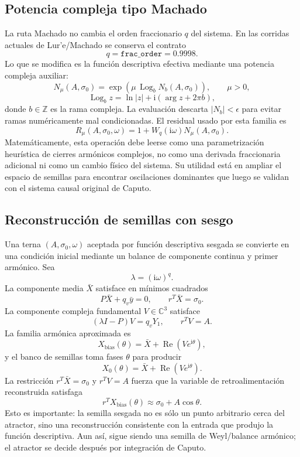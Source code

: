 \documentclass[11pt]{article}
\newcommand{\ii}{\mathrm{i}}
\newcommand{\Log}{\operatorname{Log}}
\begin{document}
\subsection{Potencia compleja tipo Machado}

La ruta Machado no cambia el orden fraccionario \(q\) del sistema. En las
corridas actuales de Lur'e/Machado se conserva el contrato
\[
q=\texttt{frac\_order}=0.9998.
\]
Lo que se modifica es la función descriptiva efectiva mediante una potencia
compleja auxiliar:
\[
N_\mu(A,\sigma_0)
=\exp\left(\mu\,\Log_b N_b(A,\sigma_0)\right),
\qquad \mu>0,
\]
\[
\Log_b z = \ln|z|+\ii\left(\arg z+2\pi b\right),
\]
donde \(b\in\mathbb{Z}\) es la rama compleja. La evaluación descarta
\(|N_b|<\epsilon\) para evitar ramas numéricamente mal condicionadas. El
residual usado por esta familia es
\[
R_\mu(A,\sigma_0,\omega)
=1+W_q(\ii\omega)N_\mu(A,\sigma_0).
\]
Matemáticamente, esta operación debe leerse como una parametrización
heurística de cierres armónicos complejos, no como una derivada fraccionaria
adicional ni como un cambio físico del sistema. Su utilidad está en ampliar el
espacio de semillas para encontrar oscilaciones dominantes que luego se
validan con el sistema causal original de Caputo.

\subsection{Reconstrucción de semillas con sesgo}

Una terna \((A,\sigma_0,\omega)\) aceptada por función descriptiva sesgada se
convierte en una condición inicial mediante un balance de componente continua
y primer armónico. Sea
\[
\lambda=(\ii\omega)^q.
\]
La componente media \(\bar X\) satisface en mínimos cuadrados
\[
P\bar X+q_v\bar y=0,\qquad r^T\bar X=\sigma_0.
\]
La componente compleja fundamental \(V\in\mathbb{C}^3\) satisface
\[
(\lambda I-P)V=q_vY_1,\qquad r^TV=A.
\]
La familia armónica aproximada es
\[
X_{\mathrm{bias}}(\theta)=
\bar X+\operatorname{Re}\left(Ve^{\ii\theta}\right),
\]
y el banco de semillas toma fases \(\theta\) para producir
\[
X_0(\theta)=\bar X+\operatorname{Re}\left(Ve^{\ii\theta}\right).
\]
La restricción \(r^T\bar X=\sigma_0\) y \(r^TV=A\) fuerza que la variable de
retroalimentación reconstruida satisfaga
\[
r^TX_{\mathrm{bias}}(\theta)
\approx \sigma_0+A\cos\theta.
\]
Esto es importante: la semilla sesgada no es sólo un punto arbitrario cerca
del atractor, sino una reconstrucción consistente con la entrada que produjo
la función descriptiva. Aun así, sigue siendo una semilla de Weyl/balance
armónico; el atractor se decide después por integración de Caputo.
\end{document}

